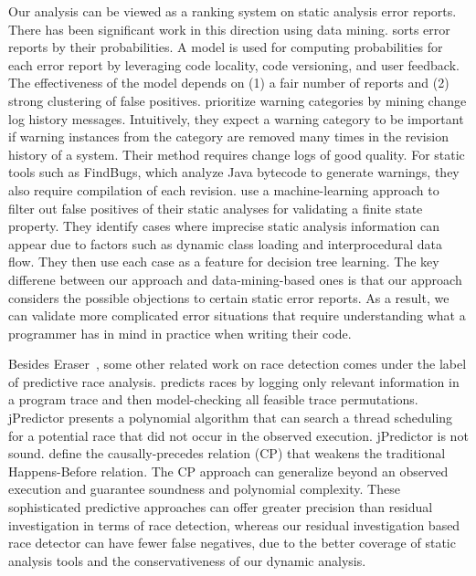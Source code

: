 Our analysis can be viewed as a ranking system on static analysis
error reports.  There has been significant work in this direction using data mining.
\cite{kremenek2004} sorts error reports by their probabilities.  A
model is used for computing probabilities for each error report by
leveraging code locality, code versioning, and user feedback.  The
effectiveness of the model depends on (1) a fair number of reports and
(2) strong clustering of false positives.  \cite{kim2007} prioritize
warning categories by mining change log history messages.
Intuitively, they expect a warning category to be important if warning
instances from the category are removed many times in the revision
history of a system. Their method requires change logs of good
quality. For static tools such as FindBugs, which analyze Java
bytecode to generate warnings, they also require compilation of each
revision.  \cite{Bodden2008FPE} use a machine-learning approach to filter out false positives of their static analyses for validating a finite state property.  They identify cases where imprecise static analysis information can appear due to factors such as dynamic class loading and interprocedural data flow.  They then use each case as a feature for decision tree learning.  The key differene between our approach and data-mining-based ones is that our approach considers the possible objections to certain static error reports.  As a result, we can validate more complicated error situations that require understanding what a programmer has in mind in practice when writing their code. 

Besides Eraser~\cite{266641}, some other related work on race detection comes under the label of predictive race analysis.  
\cite{Chen:2007:PSC:1770351.1770387} predicts races by logging only relevant information in a program trace and then model-checking all feasible trace permutations.  jPredictor \cite{Chen:2008:JPR:1368088.1368119} presents a polynomial algorithm that can search a thread scheduling for a potential race that did not occur in the observed execution. jPredictor is not sound.  \cite{Smaragdakis:2012:SPR:2103656.2103702} define the causally-precedes relation (CP) that weakens the traditional Happens-Before relation.  The CP approach can generalize beyond an observed execution and guarantee soundness and polynomial complexity. These sophisticated predictive approaches can offer greater precision than residual investigation in terms of race detection, whereas our residual investigation based race detector can have fewer false negatives, due to the better coverage of static analysis tools and the conservativeness of our dynamic analysis.


